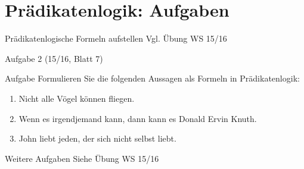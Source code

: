 \section{Prädikatenlogik: Aufgaben}

\begin{frame}{Prädikatenlogische Formeln aufstellen}
	Vgl. Übung WS 15/16
\end{frame}

\begin{frame}{Aufgabe 2 (15/16, Blatt 7)}
	\begin{block}{Aufgabe}
		Formulieren Sie die folgenden Aussagen als Formeln in Prädikatenlogik:
		\begin{enumerate}
			\item Nicht alle Vögel können fliegen.
			\item Wenn es irgendjemand kann, dann kann es Donald Ervin Knuth.
			\item John liebt jeden, der sich nicht selbst liebt.
		\end{enumerate}
	\end{block}
	
\end{frame}

\begin{frame}{Weitere Aufgaben}
	Siehe Übung WS 15/16
\end{frame}
